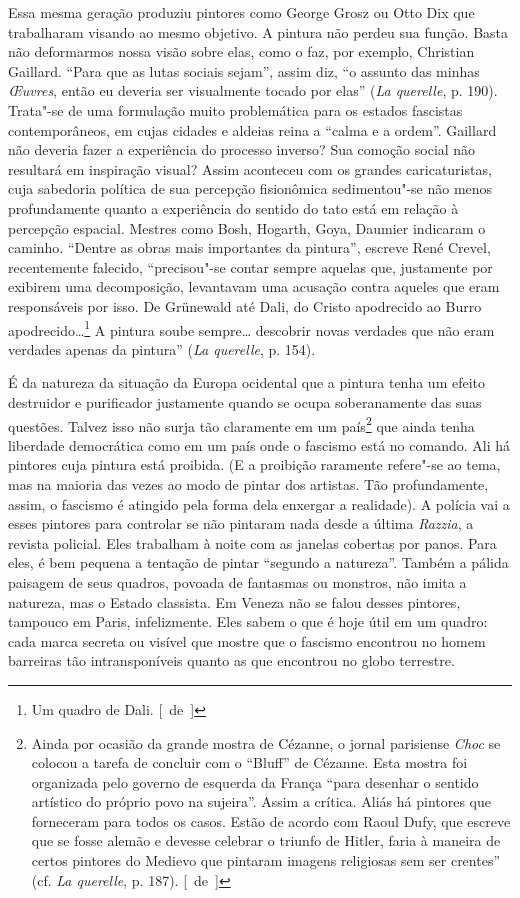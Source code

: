 Essa mesma geração produziu pintores como George Grosz ou Otto Dix que
trabalharam visando ao mesmo objetivo. A pintura não perdeu sua função.
Basta não deformarmos nossa visão sobre elas, como o faz, por
exemplo, Christian Gaillard. ``Para que as lutas sociais sejam'', assim
diz, ``o assunto das minhas \emph{\OE uvres}, então eu deveria ser
visualmente tocado por elas'' (\emph{La querelle}, p. 190). Trata"-se de
uma formulação muito problemática para os estados fascistas contemporâneos, em cujas cidades e aldeias reina a
``calma e a ordem''. Gaillard não
deveria fazer a experiência do processo inverso? Sua comoção social não
resultará em inspiração visual? Assim aconteceu com os grandes
caricaturistas, cuja sabedoria política de sua percepção fisionômica
sedimentou"-se não menos profundamente quanto a experiência do sentido do
tato está em relação à percepção espacial. Mestres como Bosh, Hogarth,
Goya, Daumier indicaram o caminho. ``Dentre as obras mais importantes da
pintura'', escreve René Crevel, recentemente falecido, ``precisou"-se
contar sempre aquelas que, justamente por exibirem uma
decomposição, levantavam uma acusação contra aqueles que eram responsáveis por isso. De Grünewald
até Dali, do Cristo apodrecido ao Burro apodrecido\ldots{}\footnote{Um quadro de
  Dali. [~de~]} A pintura soube sempre\ldots{} descobrir novas verdades que não
eram verdades apenas da pintura'' (\emph{La querelle}, p. 154).

É da natureza da situação da Europa ocidental que a pintura tenha um efeito destruidor e purificador justamente quando se ocupa soberanamente das suas questões.
Talvez isso não surja tão claramente em um
país\footnote{Ainda por ocasião da grande mostra de Cézanne, o jornal
  parisiense \emph{Choc} se colocou a tarefa de concluir com o ``Bluff'' de
  Cézanne. Esta mostra foi organizada pelo governo de esquerda da França
  ``para desenhar o sentido artístico do próprio povo na sujeira''.
  Assim a crítica. Aliás há pintores que forneceram para todos os casos.
  Estão de acordo com Raoul Dufy, que escreve que se fosse alemão e
  devesse celebrar o triunfo de Hitler, faria à maneira de certos
  pintores do Medievo que pintaram imagens religiosas sem ser
  crentes'' (cf. \emph{La querelle}, p. 187). [~de~]} que ainda tenha liberdade
democrática como em um país onde o fascismo está no comando. Ali há
pintores cuja pintura está proibida. (E a proibição raramente refere"-se
ao tema, mas na maioria das vezes ao modo de pintar dos artistas. Tão
profundamente, assim, o fascismo é atingido pela forma dela enxergar a realidade). A
polícia vai a esses pintores para controlar se não pintaram nada
desde a última \emph{Razzia}, a revista policial. Eles trabalham à noite
com as janelas cobertas por panos. Para eles, é bem pequena a tentação
de pintar ``segundo a natureza''. Também a pálida paisagem de seus
quadros, povoada de fantasmas ou monstros, não imita a
natureza, mas o Estado classista. Em Veneza não se falou desses
pintores, tampouco em Paris, infelizmente. Eles sabem o que é hoje útil
em um quadro: cada marca secreta ou visível que mostre que o fascismo
encontrou no homem barreiras tão intransponíveis quanto as que encontrou no globo
terrestre.
